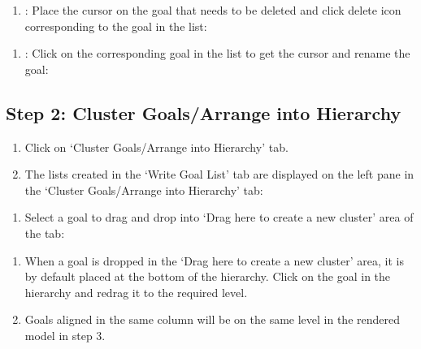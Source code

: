 \documentclass[letterpaper,10pt,english]{jupyterBook}
\begin{document}
\sphinxAtStartPar
{}
\begin{enumerate}
%
\item {} 
\sphinxAtStartPar
{}: Place the cursor on the goal that
needs to be deleted and click delete icon corresponding to the goal
in the list:

\end{enumerate}

\sphinxAtStartPar
{}
\begin{enumerate}
%
\item {} 
\sphinxAtStartPar
{}: Click on the corresponding goal in
the list to get the cursor and rename the goal:

\end{enumerate}

\sphinxAtStartPar
{}


\subsection{Step 2: Cluster Goals/Arrange into Hierarchy}
\label{\detokenize{appendices/appendix_b/motivational_model_guide:step-2-cluster-goals-arrange-into-hierarchy}}\begin{enumerate}
%
\item {} 
\sphinxAtStartPar
Click on ‘Cluster Goals/Arrange into Hierarchy’ tab.

\item {} 
\sphinxAtStartPar
The lists created in the ‘Write Goal List’ tab are displayed on the
left pane in the ‘Cluster Goals/Arrange into Hierarchy’ tab:

\end{enumerate}

\sphinxAtStartPar
{}
\begin{enumerate}
%
\item {} 
\sphinxAtStartPar
Select a goal to drag and drop into ‘Drag here to create a new
cluster’ area of the tab:

\end{enumerate}

\sphinxAtStartPar
{}
\begin{enumerate}
%
\item {} 
\sphinxAtStartPar
When a goal is dropped in the ‘Drag here to create a new cluster’
area, it is by default placed at the bottom of the hierarchy. Click
on the goal in the hierarchy and re\sphinxhyphen{}drag it to the required level.

\item {} 
\sphinxAtStartPar
Goals aligned in the same column will be on the same level in the
rendered model in step 3.

\end{enumerate}
\end{document}
